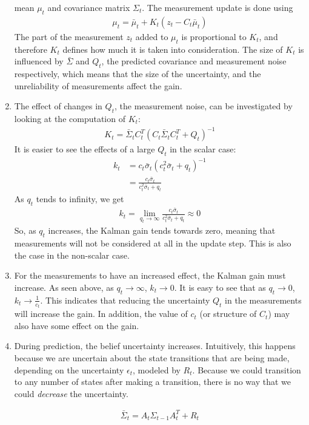 \documentclass[a4paper,12pt]{article}
\begin{document}
\begin{enumerate}
  mean $\mu_t$ and covariance matrix $\Sigma_t$. The measurement update is done
  using
  \begin{align*}
    \mu_t=\bar{\mu}_t+K_t(z_t-C_t\bar{\mu}_t)
  \end{align*}
  The part of the measurement $z_t$ added to $\mu_t$ is proportional to $K_t$,
  and therefore $K_t$ defines how much it is taken into consideration. The size
  of $K_t$ is influenced by $\bar{\Sigma}$ and $Q_t$, the predicted covariance
  and measurement noise respectively, which means that the size of the
  uncertainty, and the unreliability of measurements affect the gain.
\item The effect of changes in $Q_t$, the measurement noise, can be investigated
  by looking at the computation of $K_t$:
  \begin{align*}
    K_t=\bar{\Sigma}_tC^T_t(C_t\bar{\Sigma}_tC^T_t+Q_t)^{-1}
  \end{align*}
It is easier to see the effects of a large $Q_t$ in the scalar case:
\begin{align*}
  k_t&=c_t\bar{\sigma}_t(c^2_t\bar{\sigma}_t+q_t)^{-1}\\
  &=\frac{c_t\bar{\sigma}_t}{c^2_t\bar{\sigma}_t+q_t}
\end{align*}
As $q_t$ tends to infinity, we get
\begin{align*}
  k_t=\lim_{q_t\to \infty}\frac{c_t\bar{\sigma}_t}{c^2_t\bar{\sigma}_t+q_t} \approx 0
\end{align*}
So, as $q_t$ increases, the Kalman gain tends towards zero, meaning that
measurements will not be considered at all in the update step. This is also the
case in the non-scalar case.
\item For the measurements to have an increased effect, the Kalman gain must
  increase. As seen above, as $q_t\to \infty$, $k_t\to 0$. It is easy to see
  that as $q_t \to 0$, $k_t\to \frac{1}{c_t}$. This indicates that reducing the
  uncertainty $Q_t$ in the measurements will increase the gain. In addition,
  the value of $c_t$ (or structure of $C_t$) may also have some effect on the
  gain.
\item During prediction, the belief uncertainty increases. Intuitively, this
  happens because we are uncertain about the state transitions that are being
  made, depending on the uncertainty $\epsilon_t$, modeled by $R_t$. Because we
  could transition to any number of states after making a transition, there is
  no way that we could \emph{decrease} the uncertainty.
  
  \begin{align*}
    \bar{\Sigma}_t=A_t\Sigma_{t-1}A^T_t+R_t
  \end{align*}


\end{enumerate}
\end{document}

